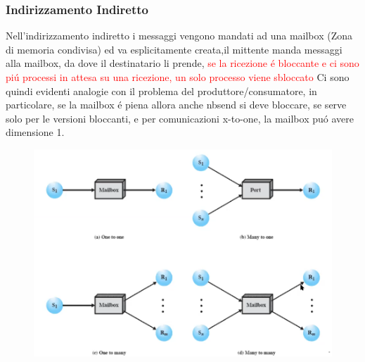 \subsubsection*{Indirizzamento Indiretto}
Nell'indirizzamento indiretto i messaggi vengono mandati ad una mailbox (Zona di memoria condivisa) ed va esplicitamente creata,il mittente manda messaggi alla mailbox,
da dove il destinatario li prende, \textcolor{red}{se la ricezione é bloccante e ci sono piú processi in attesa su una ricezione, un solo processo viene sbloccato}
Ci sono quindi evidenti analogie con il problema del produttore/consumatore, in particolare, se la mailbox é piena allora anche nbsend si deve bloccare, se serve solo per le
versioni bloccanti, e per comunicazioni x-to-one, la mailbox puó avere dimensione 1.
\begin{figure}[H]
    \centering
    \includegraphics[width=0.7\linewidth]{immagini/ComunicazioneIndiretta}
\end{figure}
